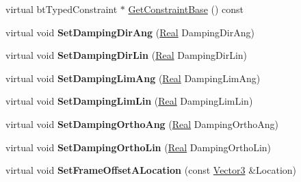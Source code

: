 \begin{DoxyCompactItemize}
\item 
virtual btTypedConstraint $\ast$ \hyperlink{classphys_1_1SliderConstraint_ae504381efb11c23b0aec8ab5c9eeb7ab}{GetConstraintBase} () const 
\item 
\hypertarget{classphys_1_1SliderConstraint_a250041975345f97799de9c7fde036fda}{
virtual void {\bfseries SetDampingDirAng} (\hyperlink{namespacephys_af7eb897198d265b8e868f45240230d5f}{Real} DampingDirAng)}
\label{classphys_1_1SliderConstraint_a250041975345f97799de9c7fde036fda}

\item 
\hypertarget{classphys_1_1SliderConstraint_a6c1c336f7c6557a8fcb4413878d52934}{
virtual void {\bfseries SetDampingDirLin} (\hyperlink{namespacephys_af7eb897198d265b8e868f45240230d5f}{Real} DampingDirLin)}
\label{classphys_1_1SliderConstraint_a6c1c336f7c6557a8fcb4413878d52934}

\item 
\hypertarget{classphys_1_1SliderConstraint_af3d0a046af12ca5e2d35bdfc609ed27b}{
virtual void {\bfseries SetDampingLimAng} (\hyperlink{namespacephys_af7eb897198d265b8e868f45240230d5f}{Real} DampingLimAng)}
\label{classphys_1_1SliderConstraint_af3d0a046af12ca5e2d35bdfc609ed27b}

\item 
\hypertarget{classphys_1_1SliderConstraint_ae20c29e2b2a3e6c4d9498371d343484e}{
virtual void {\bfseries SetDampingLimLin} (\hyperlink{namespacephys_af7eb897198d265b8e868f45240230d5f}{Real} DampingLimLin)}
\label{classphys_1_1SliderConstraint_ae20c29e2b2a3e6c4d9498371d343484e}

\item 
\hypertarget{classphys_1_1SliderConstraint_a69a89c6984f3ba738a84e52fc8e47255}{
virtual void {\bfseries SetDampingOrthoAng} (\hyperlink{namespacephys_af7eb897198d265b8e868f45240230d5f}{Real} DampingOrthoAng)}
\label{classphys_1_1SliderConstraint_a69a89c6984f3ba738a84e52fc8e47255}

\item 
\hypertarget{classphys_1_1SliderConstraint_afc45b003e5ee277d8991130534b2e4bf}{
virtual void {\bfseries SetDampingOrthoLin} (\hyperlink{namespacephys_af7eb897198d265b8e868f45240230d5f}{Real} DampingOrthoLin)}
\label{classphys_1_1SliderConstraint_afc45b003e5ee277d8991130534b2e4bf}

\item 
\hypertarget{classphys_1_1SliderConstraint_a8968c8a93630a4e712a48efde04e74f6}{
virtual void {\bfseries SetFrameOffsetALocation} (const \hyperlink{classphys_1_1Vector3}{Vector3} \&Location)}
\label{classphys_1_1SliderConstraint_a8968c8a93630a4e712a48efde04e74f6}


\end{DoxyCompactItemize}
